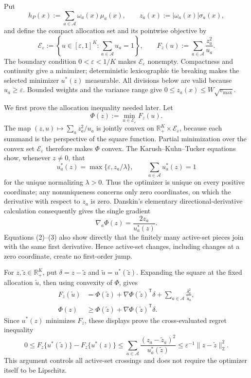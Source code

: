 Put
\[
h_P(x):=\sum_{a\in\mathcal A}\omega_a(x)\mu_a(x),
\qquad
z_a(x):=|\omega_a(x)|\sigma_a(x),
\]
and define the compact allocation set and its pointwise objective by
\[
\mathcal E_{\varepsilon}:=
\left\{u\in[\varepsilon,1]^K:\sum_{a\in\mathcal A}u_a=1\right\},
\qquad
F_z(u):=\sum_{a\in\mathcal A}\frac{z_a^2}{u_a}.
\tag{1}
\]
The boundary condition \(0<\varepsilon<1/K\) makes \(\mathcal E_{\varepsilon}\) nonempty.  Compactness and continuity give a minimizer; deterministic lexicographic tie breaking makes the selected minimizer \(u^*(z)\) measurable.  All divisions below are valid because \(u_a\geq\varepsilon\).  Bounded weights and the variance range give \(0\leq z_a(x)\leq W\sqrt{v_{\max}}\).

We first prove the allocation inequality needed later.  Let
\[
\Phi(z):=\min_{u\in\mathcal E_{\varepsilon}}F_z(u).
\]
The map \((z,u)\mapsto\sum_a z_a^2/u_a\) is jointly convex on \(\mathbb R_+^K\times\mathcal E_{\varepsilon}\), because each summand is the perspective of the square function.  Partial minimization over the convex set \(\mathcal E_{\varepsilon}\) therefore makes \(\Phi\) convex.  The Karush--Kuhn--Tucker equations show, whenever \(z\neq0\), that
\[
u_a^*(z)=\max\{\varepsilon,z_a/\lambda\},
\qquad
\sum_{a\in\mathcal A}u_a^*(z)=1
\tag{2}
\]
for the unique normalizing \(\lambda>0\).  Thus the optimizer is unique on every positive coordinate; any nonuniqueness concerns only zero coordinates, on which the derivative with respect to \(z_a\) is zero.  Danskin's elementary directional-derivative calculation consequently gives the single gradient
\[
\nabla_a\Phi(z)=\frac{2z_a}{u_a^*(z)}.
\tag{3}
\]
Equations (2)--(3) also show directly that the finitely many active-set pieces join with the same first derivative.  Hence active-set changes, including changes at a zero coordinate, create no first-order jump.

For \(z,\widetilde z\in\mathbb R_+^K\), put \(\delta=z-\widetilde z\) and \(\widetilde u=u^*(\widetilde z)\).  Expanding the square at the fixed allocation \(\widetilde u\), then using convexity of \(\Phi\), gives
\[
\begin{aligned}
F_z(\widetilde u)
&=\Phi(\widetilde z)+\nabla\Phi(\widetilde z)^{\mathsf T}\delta
  +\sum_{a\in\mathcal A}\frac{\delta_a^2}{\widetilde u_a},\\
\Phi(z)&\geq
\Phi(\widetilde z)+\nabla\Phi(\widetilde z)^{\mathsf T}\delta.
\end{aligned}
\]
Since \(u^*(z)\) minimizes \(F_z\), these displays prove the cross-evaluated regret inequality
\[
0\leq F_z\{u^*(\widetilde z)\}-F_z\{u^*(z)\}
\leq \sum_{a\in\mathcal A}\frac{(z_a-\widetilde z_a)^2}{u_a^*(\widetilde z)}
\leq\varepsilon^{-1}\|z-\widetilde z\|_2^2.
\tag{4}
\]
This argument controls all active-set crossings and does not require the optimizer itself to be Lipschitz.

